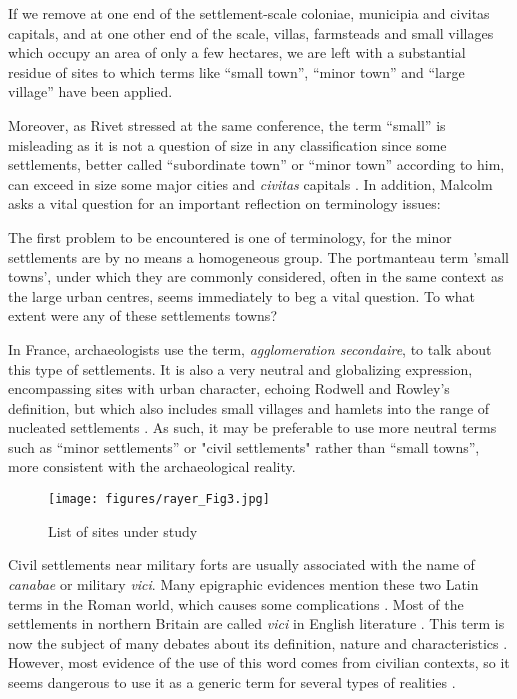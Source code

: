 \begin{aquote}{\cite[1]{Rodwell_1975}}
If we remove at one end of the settlement-scale coloniae, municipia and civitas capitals, and at one other end of the scale, villas, farmsteads and small villages which occupy an area of only a few hectares, we are left with a substantial residue of sites to which terms like “small town”, “minor town” and “large village” have been applied.
\end{aquote}
Moreover, as Rivet stressed at the same conference, the term “small” is misleading as it is not a question of size in any classification since some settlements, better called “subordinate town” or “minor town” according to him, can exceed in size some major cities and \emph{civitas} capitals \parencite[111]{Rivet_1975b}.
In addition, Malcolm \textcite[115]{Todd_1970} asks a vital question for an important reflection on terminology issues: 

\begin{aquote}{\cite[115]{Todd_1970}}
The first problem to be encountered is one of terminology, for the minor settlements are by no means a homogeneous group. The portmanteau term 'small towns', under which they are commonly considered, often in the same context as the large urban centres, seems immediately to beg a vital question. To what extent were any of these settlements towns?
\end{aquote}
In France, archaeologists use the term, \emph{agglomeration secondaire}, to talk about this type of settlements. It is also a very neutral and globalizing expression, encompassing sites with urban character, echoing Rodwell and Rowley’s definition, but which also includes small villages and hamlets into the range of nucleated settlements \parencite[18]{Mangin_1986}. As such, it may be preferable to use more neutral terms such as “minor settlements” or "civil settlements" rather than “small towns”, more consistent with the archaeological reality.

	\begin{figure}[!p]
		\texttt{[image: figures/rayer\_Fig3.jpg]}
		\caption{List of sites under study}
		\label{fig:Rayer_Fig3}
	\end{figure}

	
Civil settlements near military forts are usually associated with the name of \emph{canabae} or military \emph{vici}. Many epigraphic evidences mention these two Latin terms in the Roman world, which causes some complications \parencite[for this debate, see][]{Tarpin_2002}. Most of the settlements in northern Britain are called \emph{vici} in English literature \parencites(cf.)(){Salway_1965}{Sommer_1984}{Sommer_2006}. 
This term is now the subject of many debates about its definition, nature and characteristics \parencite{Tarpin_2002}. However, most evidence of the use of this word comes from civilian contexts, 
so it seems dangerous to use it as a generic term for several types of realities \parencites[42--43]{Favory_2012}{Tarpin_2002}.	
	
